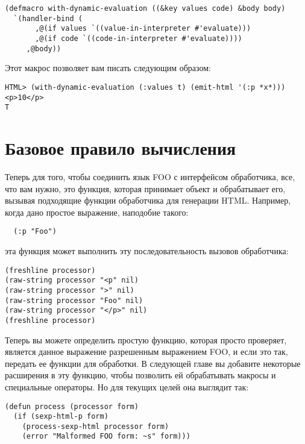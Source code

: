 \begin{lstlisting}
(defmacro with-dynamic-evaluation ((&key values code) &body body)
  `(handler-bind (
       ,@(if values `((value-in-interpreter #'evaluate)))
       ,@(if code `((code-in-interpreter #'evaluate))))
     ,@body))
\end{lstlisting}

Этот макрос позволяет вам писать следующим образом: 

\begin{lstlisting}
HTML> (with-dynamic-evaluation (:values t) (emit-html '(:p *x*)))
<p>10</p>
T
\end{lstlisting}


\section{Базовое правило вычисления}

Теперь для того, чтобы соединить язык FOO с интерфейсом обработчика, все, что вам нужно,
это функция, которая принимает объект и обрабатывает его, вызывая подходящие функции
обработчика для генерации HTML. Например, когда дано простое выражение, наподобие такого:

\begin{verbatim}
  (:p "Foo")
\end{verbatim}

эта функция может выполнить эту последовательность вызовов обработчика:

\begin{lstlisting}
(freshline processor)
(raw-string processor "<p" nil)
(raw-string processor ">" nil)
(raw-string processor "Foo" nil)
(raw-string processor "</p>" nil)
(freshline processor)
\end{lstlisting}

Теперь вы можете определить простую функцию, которая просто проверяет, является данное
выражение разрешенным выражением FOO, и если это так, передать ее функции
 для обработки. В следующей главе вы добавите некоторые расширения
в эту функцию, чтобы позволить ей обрабатывать макросы и специальные операторы. Но для
текущих целей она выглядит так:

\begin{lstlisting}
(defun process (processor form)
  (if (sexp-html-p form)
    (process-sexp-html processor form)
    (error "Malformed FOO form: ~s" form)))
\end{lstlisting}

